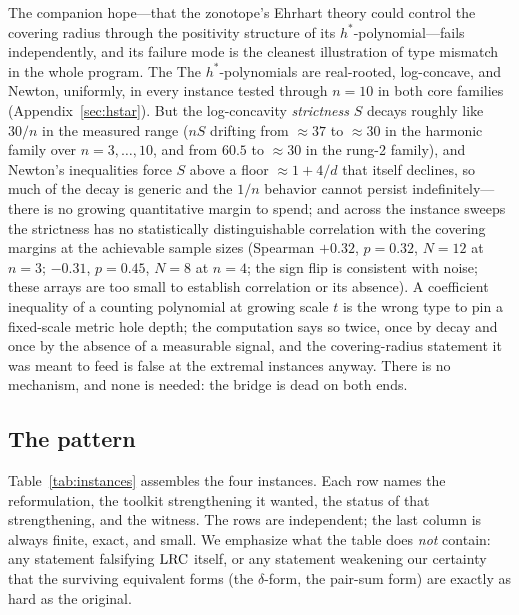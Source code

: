 The companion hope---that the zonotope's Ehrhart theory could control
the covering radius through the positivity structure of its
$h^*$-polynomial---fails independently, and its failure mode is the
cleanest illustration of type mismatch in the whole program. The
The $h^*$-polynomials are real-rooted, log-concave, and Newton, uniformly,
in every instance tested through $n=10$ in both core families
(Appendix~\ref{sec:hstar}). But the log-concavity \emph{strictness} $S$
decays roughly like $30/n$ in the measured range ($nS$ drifting from
$\approx37$ to $\approx30$ in the harmonic family over
$n=3,\dots,10$, and from $60.5$ to $\approx30$ in the rung-2 family),
and Newton's inequalities force $S$ above a floor $\approx1+4/d$ that
itself declines, so much of the decay is generic and the $1/n$ behavior
cannot persist indefinitely---there is no growing quantitative margin to
spend; and across the instance sweeps the strictness has no
statistically distinguishable correlation with the covering margins at
the achievable sample sizes (Spearman $+0.32$, $p=0.32$, $N=12$ at
$n=3$; $-0.31$, $p=0.45$, $N=8$ at $n=4$; the sign flip is consistent
with noise; these arrays are too small to establish correlation or its
absence). A
coefficient inequality of a counting polynomial at growing scale $t$ is
the wrong type to pin a fixed-scale metric hole depth; the computation
says so twice, once by decay and once by the absence of a measurable
signal, and the covering-radius statement it was meant to feed is false
at the extremal instances anyway. There is no mechanism, and none is
needed: the bridge is dead on both ends.

\subsection{The pattern}

Table~\ref{tab:instances} assembles the four instances. Each row names
the reformulation, the toolkit strengthening it wanted, the status of
that strengthening, and the witness. The rows are independent; the last
column is always finite, exact, and small. We emphasize what the table
does \emph{not} contain: any statement falsifying $\mathrm{LRC}$ itself, or any
statement weakening our certainty that the surviving equivalent forms
(the $\delta$-form, the pair-sum form) are exactly as hard as the
original.

